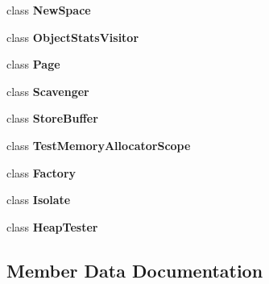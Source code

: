 \begin{DoxyCompactItemize}
\item 
class {\bfseries New\+Space}\hypertarget{classv8_1_1internal_1_1_heap_a71065109e762b07b59b80cd64d885ff8}{}\label{classv8_1_1internal_1_1_heap_a71065109e762b07b59b80cd64d885ff8}

\item 
class {\bfseries Object\+Stats\+Visitor}\hypertarget{classv8_1_1internal_1_1_heap_ab42f552b8cb90ef9385a0e340b5d0abd}{}\label{classv8_1_1internal_1_1_heap_ab42f552b8cb90ef9385a0e340b5d0abd}

\item 
class {\bfseries Page}\hypertarget{classv8_1_1internal_1_1_heap_a66d145c56e1747e0aecb5309042ab183}{}\label{classv8_1_1internal_1_1_heap_a66d145c56e1747e0aecb5309042ab183}

\item 
class {\bfseries Scavenger}\hypertarget{classv8_1_1internal_1_1_heap_a69194b9c6def4e9ec4e2c07b61f7f5a3}{}\label{classv8_1_1internal_1_1_heap_a69194b9c6def4e9ec4e2c07b61f7f5a3}

\item 
class {\bfseries Store\+Buffer}\hypertarget{classv8_1_1internal_1_1_heap_af53b41f2b174f4a360658c2f08e20975}{}\label{classv8_1_1internal_1_1_heap_af53b41f2b174f4a360658c2f08e20975}

\item 
class {\bfseries Test\+Memory\+Allocator\+Scope}\hypertarget{classv8_1_1internal_1_1_heap_aec8272868361afdd8e9cd777f30198f9}{}\label{classv8_1_1internal_1_1_heap_aec8272868361afdd8e9cd777f30198f9}

\item 
class {\bfseries Factory}\hypertarget{classv8_1_1internal_1_1_heap_a328c093d609680cca505905c6d49901a}{}\label{classv8_1_1internal_1_1_heap_a328c093d609680cca505905c6d49901a}

\item 
class {\bfseries Isolate}\hypertarget{classv8_1_1internal_1_1_heap_aba4f0964bdacf2bbf62cf876e5d28d0a}{}\label{classv8_1_1internal_1_1_heap_aba4f0964bdacf2bbf62cf876e5d28d0a}

\item 
class {\bfseries Heap\+Tester}\hypertarget{classv8_1_1internal_1_1_heap_aee0aab59f992bea8603b7be9e9b2f30d}{}\label{classv8_1_1internal_1_1_heap_aee0aab59f992bea8603b7be9e9b2f30d}

\end{DoxyCompactItemize}


\subsection{Member Data Documentation}

